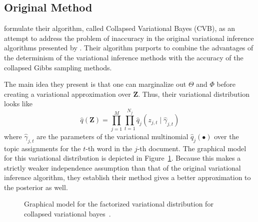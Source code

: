 \documentclass[11pt]{article}
\begin{document}
\subsection{Original Method}

\citet*{Teh:2007:CVB} formulate their algorithm, called Collapsed
Variational Bayes (CVB), as an attempt to address the problem of inaccuracy
in the original variational inference algorithms presented by
\citet{Blei:2003:LDA}. Their algorithm purports to combine the advantages
of the determinism of the variational inference methods with the accuracy
of the collapsed Gibbs sampling methods.

The main idea they present is that one can marginalize out $\Theta$ and
$\Phi$ before creating a variational approximation over $\mathbf{Z}$. Thus,
their variational distribution looks like
\begin{equation}
  \hat{q}(\mathbf{Z}) = \prod_{j=1}^M \prod_{t=1}^{N_j} \hat{q}_j(z_{j,t} \mid
  \hat{\gamma}_{j,t})
\end{equation}
where $\hat{\gamma}_{j,t}$ are the parameters of the variational
multinomial $\hat{q}_j(\bullet)$ over the topic assignments for the $t$-th
word in the $j$-th document. The graphical model for this variational
distribution is depicted in Figure~\ref{fig:cvbvardist}. Because this makes
a strictly weaker independence assumption than that of the original
variational inference algorithm, they establish their method gives a better
approximation to the posterior as well.

\begin{figure}[h]
  \begin{center}
  \end{center}
  \caption{Graphical model for the factorized variational distribution for
  collapsed variational bayes~\cite{Teh:2007:CVB}.}
  \label{fig:cvbvardist}
\end{figure}
\end{document}
